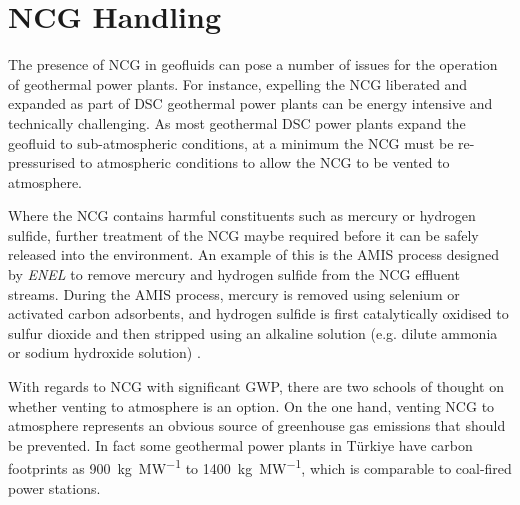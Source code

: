 

\section{NCG Handling}
    \label{sec:litrev_NCG_handling}

    The presence of \ac{NCG} in geofluids can pose a number of issues for the operation of geothermal power plants. For instance, expelling the \ac{NCG} liberated and expanded as part of \ac{DSC} geothermal power plants can be energy intensive and technically challenging. As most geothermal \ac{DSC} power plants expand the geofluid to sub-atmospheric conditions, at a minimum the \ac{NCG} must be re-pressurised to atmospheric conditions to allow the \ac{NCG} to be vented to atmosphere.

    Where the \ac{NCG} contains harmful constituents such as mercury or hydrogen sulfide, further treatment of the \ac{NCG} maybe required before it can be safely released into the environment. An example of this is the AMIS process designed by \emph{ENEL} to remove mercury and hydrogen sulfide from the \ac{NCG} effluent streams. During the AMIS process, mercury is removed using selenium or activated carbon adsorbents, and hydrogen sulfide is first catalytically oxidised to sulfur dioxide and then stripped using an alkaline solution (e.g. dilute ammonia or sodium hydroxide solution) \cite{Baldacci2005, Manzella2018}.

    With regards to \ac{NCG} with significant \ac{GWP}, there are two schools of thought on whether venting to atmosphere is an option. On the one hand, venting \ac{NCG} to atmosphere represents an obvious source of greenhouse gas emissions that should be prevented. In fact some geothermal power plants in Türkiye have carbon footprints as \qty{900}{\kg\per\mega\watt} to \qty{1400}{\kg\per\mega\watt}, which is comparable to coal-fired power stations.
    

